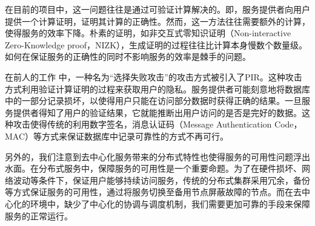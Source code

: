 在目前的项目中，这一问题往往是通过可验证计算解决的。即，服务提供者向用户提供一个计算证明，证明其计算的正确性。然而，这一方法往往需要额外的计算，使得服务的效率下降。朴素的证明，如非交互式零知识证明（Non-interactive Zero-Knowledge proof，NIZK），生成证明的过程往往比计算本身慢数个数量级。如何在保证服务的正确性的同时不影响服务的效率是棘手的问题。

在前人的工作 \cite{APIR} 中，一种名为“选择失败攻击”的攻击方式被引入了PIR。这种攻击方式利用验证计算证明的过程来获取用户的隐私。服务提供者可能刻意地将数据库中的一部分记录损坏，以使得用户只能在访问部分数据时获得正确的结果。一旦服务提供者得知了用户的验证结果，它就能推断出用户访问的是否是完好的数据。这种攻击使得传统的利用数字签名，消息认证码（Message Authentication Code，MAC）等方式来保证数据库中记录可靠性的方式不再可行。

另外的，我们注意到去中心化服务带来的分布式特性也使得服务的可用性问题浮出水面。在分布式服务中，保障服务的可用性是一个重要命题。为了在硬件损坏、网络波动等条件下，保证用户能够持续访问服务，传统的分布式集群采用冗余，备份等方式保证服务的可用性，通过将服务切换至备用节点屏蔽故障的节点。而在去中心化的环境中，缺少了中心化的协调与调度机制，我们需要更加可靠的手段来保障服务的正常运行。
